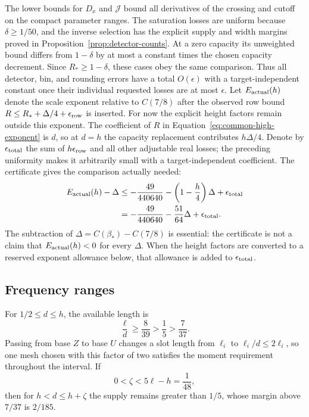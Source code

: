 \documentclass[11pt,a4paper]{article}
\numberwithin{equation}{section}
\numberwithin{figure}{section}
\theoremstyle{definition}
\theoremstyle{remark}
\begin{document}
The lower bounds for \(D_x\) and \(\mathcal J\) bound all derivatives
of the crossing and cutoff on the compact parameter ranges.
The saturation losses are uniform because \(\delta\ge1/50\),
and the inverse selection has the explicit supply and width margins
proved in Proposition~\ref{prop:detector-counts}.  At a zero
capacity its unweighted bound differs from \(1-\delta\) by at
most a constant times the chosen capacity decrement.  Since
\(R_*\ge1-\delta\), these cases obey the same comparison.
Thus all detector, bin, and rounding errors have a total
\(O(\epsilon)\) with a target-independent constant once their
individual requested losses are at most \(\epsilon\).
Let \(E_{\rm actual}(h)\) denote the scale exponent relative to
\(C(7/8)\) after the observed row bound
\(R\le R_*+\Delta/4+\epsilon_{\rm row}\) is inserted.
For now the explicit height factors remain outside this exponent.
The coefficient of \(R\) in Equation~\eqref{eq:common-high-exponent}
is \(d\), so at \(d=h\) the capacity replacement contributes
\(h\Delta/4\).  Denote by \(\epsilon_{\rm total}\) the sum of
\(h\epsilon_{\rm row}\) and all other adjustable real losses; the
preceding uniformity makes it arbitrarily small with a
target-independent coefficient.  The certificate gives the
comparison actually needed:
\begin{equation}
 \begin{split}
 E_{\rm actual}(h)-\Delta
 &\le-\frac{49}{440640}-\left(1-\frac h4\right)\Delta
       +\epsilon_{\rm total}\\
 &=-\frac{49}{440640}-\frac{51}{64}\Delta
       +\epsilon_{\rm total}.
 \end{split}
 \label{eq:adaptive-endpoint}
\end{equation}
The subtraction of \(\Delta=C(\beta_*)-C(7/8)\) is essential:
the certificate is not a claim that \(E_{\rm actual}(h)<0\) for
every \(\Delta\).  When the height factors are converted to a
reserved exponent allowance below, that allowance is added to
\(\epsilon_{\rm total}\).

\subsection{Frequency ranges}

For \(1/2\le d\le h\), the available length is
\[
 \frac{\ell}{d}\ge\frac8{39}>\frac15>\frac7{37}.
\]
Passing from base \(Z\) to base \(U\) changes a slot length from
\(\ell_i\) to \(\ell_i/d\le2\ell_i\), so one mesh chosen with
this factor of two satisfies the moment requirement throughout the
interval.  If
\[
 0<\zeta<5\ell-h=\frac1{48},
\]
then for \(h<d\le h+\zeta\) the supply remains greater than
\(1/5\), whose margin above \(7/37\) is \(2/185\).
\end{document}
